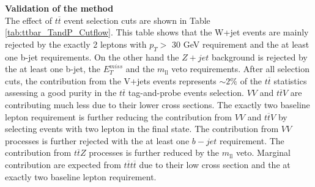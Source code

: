 		
	\par{\bf Validation of the method \\}
	The effect of $t\overline{t}$ event selection cuts are shown in Table \ref{tab:ttbar_TandP_Cutflow}. This table shows that the W+jet events are mainly rejected by the exactly 2 leptons with $p_{T} >$ 30 GeV requirement and the at least one b-jet requirements. On the other hand the $Z+jet$ background is rejected by the at least one b-jet, the $E_T^{miss}$ and the $m_{\mathrm{ll}}$ veto requirements. After all selection cuts, the contribution from the V+jets events represents $\sim2\%$ of the $t\overline{t}$ statistics assessing a good purity in the $t\overline{t}$ tag-and-probe events selection. $VV$ and $t\overline{t}V$ are contributing much less due to their lower cross sections. The exactly two baseline lepton requirement is further reducing the contribution from $VV$ and $t\overline{t}V$ by selecting events with two lepton in the final state. The contribution from $VV$ processes is further rejected with the at least one $b-jet$ requirement. The contribution from $t\overline{t}Z$ processes is further reduced by the $m_{\mathrm{ll}}$ veto. Marginal contribution are expected from $t\overline{t}t\overline{t}$ due to their low cross section and the at exactly two baseline lepton requirement.
		
